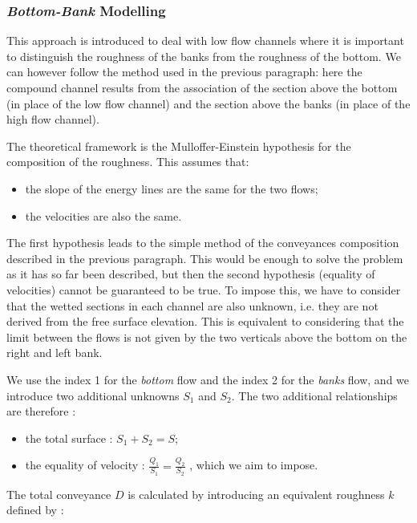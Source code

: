 \subsubsection{\emph{Bottom-Bank} Modelling}

This approach is introduced to deal with low flow channels where it is important to distinguish the roughness of the banks from the roughness of the bottom. We can however follow the method used in the previous paragraph: here the compound channel results from the association of the section above the bottom (in place of the low flow channel) and the section above the banks (in place of the high flow channel).

The theoretical framework is the Mulloffer-Einstein hypothesis \cite{NICOLLET79} for the composition of the roughness. This assumes that:
\begin{itemize}
 \item the slope of the energy lines are the same for the two flows;
 \item the velocities are also the same.
\end{itemize}

The first hypothesis leads to the simple method of the conveyances composition described in the previous paragraph. This would be enough to solve the problem as it has so far been described, but then the second hypothesis (equality of velocities) cannot be guaranteed to be true. To impose this, we have to consider that the wetted sections in each channel are also unknown, i.e. they are not derived from the free surface elevation. This is equivalent to considering that the limit between the flows is not given by the two verticals above the bottom on the right and left bank.

We use the index 1 for the \textit{bottom} flow and the index 2 for the \textit{banks} flow, and we introduce two additional unknowns $S_1$ and $S_2$. The two additional relationships are therefore :

\begin{itemize}
 \item the total surface : $S_1 + S_2 = S$;
 \item the equality of velocity : $\frac{Q_1}{S_1}=\frac{Q_2}{S_2}$ , which we aim to impose.
\end{itemize}

The total conveyance $D$ is calculated by introducing an equivalent roughness $k$ defined by :

